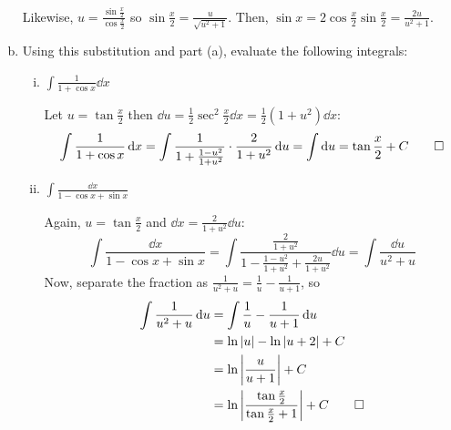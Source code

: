 \documentclass{agony}
\begin{document}
\begin{enumerate}[(a)]
\begin{prf}
          Likewise, $u = \frac{\sin\frac{x}{2}}{\cos\frac{x}{2}}$ so
          $\sin\frac{x}{2} = \frac{u}{\sqrt{u^2+1}}$.
          Then, $\sin x = 2\cos\frac{x}{2}\sin\frac{x}{2} = \frac{2u}{u^2+1}$.
        \end{prf}
  \item Using this substitution and part (a), evaluate the following integrals:
        \begin{enumerate}[i.]
          \item $\displaystyle\int \frac{1}{1+\cos x} \dd{x}$
                \begin{sol}
                  Let $u = \tan\frac{x}{2}$
                  then $\dd{u} = \frac12\sec^2\frac{x}{2} \dd{x} = \frac12(1+u^2)\dd{x}$:
                  \begin{equation*}
                    \int \frac{1}{1+\cos x} \dd{x}
                    = \int \frac{1}{1+\frac{1-u^2}{1+u^2}}\cdot\frac{2}{1+u^2} \dd{u}
                    = \int \dd{u}
                    = \tan\frac{x}{2} + C \qedhere
                  \end{equation*}
                \end{sol}
          \item $\displaystyle\int \frac{\dd{x}}{1 - \cos x + \sin x}$
                \begin{sol}
                  Again, $u = \tan\frac{x}{2}$ and $\dd{x} = \frac{2}{1+u^2}\dd{u}$:
                  \begin{equation*}
                    \int \frac{\dd{x}}{1 - \cos x + \sin x}
                    = \int \frac{\frac{2}{1+u^2}}{1 - \frac{1-u^2}{1+u^2} + \frac{2u}{1+u^2}} \dd{u}
                    = \int \frac{\dd{u}}{u^2 + u}
                  \end{equation*}
                  Now, separate the fraction as $\frac{1}{u^2+u} = \frac{1}{u} - \frac{1}{u+1}$, so
                  \begin{align*}
                    \int \frac{1}{u^2 + u} \dd{u}
                     & = \int \frac{1}{u} - \frac{1}{u+1} \dd{u}                         \\
                     & = \ln\abs{u} - \ln\abs{u+2} + C                                   \\
                     & = \ln\abs{\frac{u}{u+1}} + C                                      \\
                     & = \ln\abs{\frac{\tan\frac{x}{2}}{\tan\frac{x}{2}+1}} + C \qedhere
                  \end{align*}
                \end{sol}
        \end{enumerate}
\end{enumerate}
\end{document}
